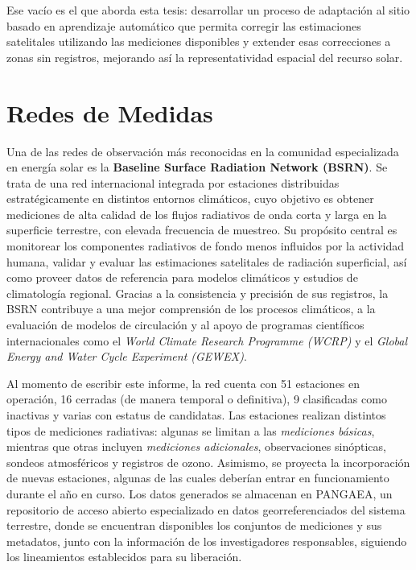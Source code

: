 \documentclass[letterpaper,12pt, twoside]{report}
\providecommand{\DIFdeltex}[1]{{\protect\color{red} \scriptsize #1}} %
\providecommand{\DIFdel}[1]{\texorpdfstring{\DIFdeltex{#1}}{}} %
\begin{document}
\DIFdel{Ese vacío es el que aborda esta tesis: desarrollar un proceso de adaptación al sitio basado en aprendizaje automático que permita corregir las estimaciones satelitales utilizando las mediciones disponibles y extender esas correcciones a zonas sin registros, mejorando así la representatividad espacial del recurso solar.
}%

\section{\DIFdel{Redes de Medidas}}
\addtocounter{section}{-1}%

\DIFdel{Una de las redes de observación más reconocidas en la comunidad especializada en energía solar es la \textbf{Baseline Surface Radiation Network (BSRN)}. Se trata de una red internacional integrada por estaciones distribuidas estratégicamente en distintos entornos climáticos, cuyo objetivo es obtener mediciones de alta calidad de los flujos radiativos de onda corta y larga en la superficie terrestre, con elevada frecuencia de muestreo. Su propósito central es monitorear los componentes radiativos de fondo menos influidos por la actividad humana, validar y evaluar las estimaciones satelitales de radiación superficial, así como proveer datos de referencia para modelos climáticos y estudios de climatología regional. Gracias a la consistencia y precisión de sus registros, la BSRN contribuye a una mejor comprensión de los procesos climáticos, a la evaluación de modelos de circulación y al apoyo de programas científicos internacionales como el \textit{World Climate Research Programme (WCRP)} y el \textit{Global Energy and Water Cycle Experiment (GEWEX)}.
}%

\DIFdel{Al momento de escribir este informe, la red cuenta con 51 estaciones en operación, 16 cerradas (de manera temporal o definitiva), 9 clasificadas como inactivas y varias con estatus de candidatas. Las estaciones realizan distintos tipos de mediciones radiativas: algunas se limitan a las \textit{mediciones básicas}, mientras que otras incluyen \textit{mediciones adicionales}, observaciones sinópticas, sondeos atmosféricos y registros de ozono. Asimismo, se proyecta la incorporación de nuevas estaciones, algunas de las cuales deberían entrar en funcionamiento durante el año en curso. Los datos generados se almacenan en PANGAEA, un repositorio de acceso abierto especializado en datos georreferenciados del sistema terrestre, donde se encuentran disponibles los conjuntos de mediciones y sus metadatos, junto con la información de los investigadores responsables, siguiendo los lineamientos establecidos para su liberación.
}%
\end{document}
